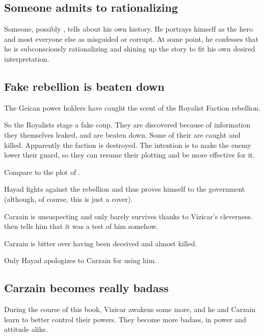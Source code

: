 






\subsection{Someone admits to rationalizing}
Someone, possibly \Ishna, tells about his own history. He portrays himself as the hero and most everyone else as misguided or corrupt. At some point, he confesses that he is subconsciously rationalizing and shining up the story to fit his own desired interpretation. 







\subsection{Fake rebellion is beaten down}
The Geican power holders have caught the scent of the Royalist Faction rebellion. 

So the Royalists stage a fake coup. They are discovered because of information they themselves leaked, and are beaten down. Some of their  are caught and killed. Apparently the faction is destroyed. The intention is to make the enemy lower their guard, so they can resume their plotting and be more effective for it. 

Compare to the plot of . 

Hayad fights against the rebellion and thus proves himself  to the government (although, of course, this is just a cover). 

Carzain is unsuspecting and only barely survives thanks to Vizicar's cleverness. \Belzir{} then tells him that it was a test of him somehow. 

Carzain is bitter over having been deceived and almost killed. 

Only Hayad apologizes to Carzain for using him. 







\subsection{Carzain becomes really badass}
During the course of this book, Vizicar awakens some more, and he and Carzain learn to better control their powers. They become more badass, in power and attitude alike. 

